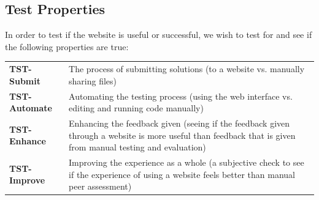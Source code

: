 \documentclass[a4paper,11pt]{report}
\begin{document}
\subsection{Test Properties}
In order to test if the website is useful or successful, we wish to test for and see if the following properties are true:\\
\begin{tabularx}{\textwidth}{lX}
 \textbf{TST-Submit} & The process of submitting solutions (to a website vs. manually sharing files)\\
 \textbf{TST-Automate} & Automating the testing process (using the web interface vs. editing and running code manually)\\
 \textbf{TST-Enhance} & Enhancing the feedback given (seeing if the feedback given through a website is more useful than feedback that is given from manual testing and evaluation)\\
 \textbf{TST-Improve} & Improving the experience as a whole (a subjective check to see if the experience of using a website feels better than manual peer assessment)\\
\end{tabularx}
\end{document}
